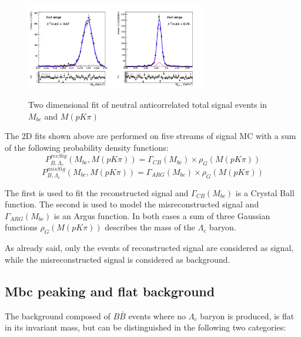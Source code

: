 \begin{figure}
\centering
{\includegraphics[width=0.7\textwidth]{04-SimultaneousFit/figs/NEWstream01234_TotalSignal_neutral_anticorrLambdaC_2Dfit.png}}
\caption{Two dimensional fit of neutral anticorrelated total signal events in $M_{bc}$  and $M(p K \pi)$ }
\label{fig:5streams_TotalSignal_neutral_anticorrLambdaC_2Dfit}
\end{figure}
\newpage
The 2D fits shown above are  performed on five streams of signal MC with a sum of the following probability density functions:
\vspace{0.2 cm}
 \begin{equation}
        P^{recSig}_{B,\Lambda_c}(M_{bc}, M(p K \pi)) = \Gamma_{CB}(M_{bc}) \times \rho_G(M(p K \pi))
    \label{eq:RecSigEq}
\end{equation} 
\begin{equation}
        P^{misSig}_{B,\Lambda_c}(M_{bc}, M(p K \pi)) = \Gamma_{ARG}(M_{bc}) \times \rho_G(M(p K \pi))
    \end{equation}  \label{eq:MisSigEq}

The first is used to fit the reconstructed signal and $\Gamma_{CB}(M_{bc})$ is a Crystal Ball function. The second is used to model the misreconstructed signal and $\Gamma_{ARG}(M_{bc})$ is an Argus function. In both cases a sum of three Gaussian functions $\rho_G(M(p K \pi))$ describes the mass of the $\Lambda_c$ baryon.  


As already said, only the events of reconstructed signal are considered as signal, while the misreconstructed signal is considered as background.

\subsection{Mbc peaking and flat background}

The background composed of $B\bar{B}$ events where no $\Lambda_c$ baryon  is produced, is flat in its invariant mass, but  can be distinguished in the following two categories:

